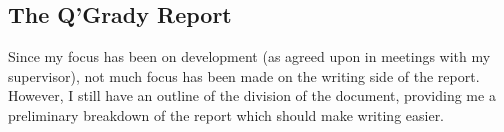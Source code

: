 \documentclass[report.tex]{subfiles}
\begin{document}
\subsection{The Q'Grady Report} %
\label{sub:the_q_grady_report}
Since my focus has been on development (as agreed upon in meetings with my
supervisor), not much focus has been made on the writing side of the report.
However, I still have an outline of the division of the document, providing me
a preliminary breakdown of the report which should make writing easier.
\newpage
\end{document}
